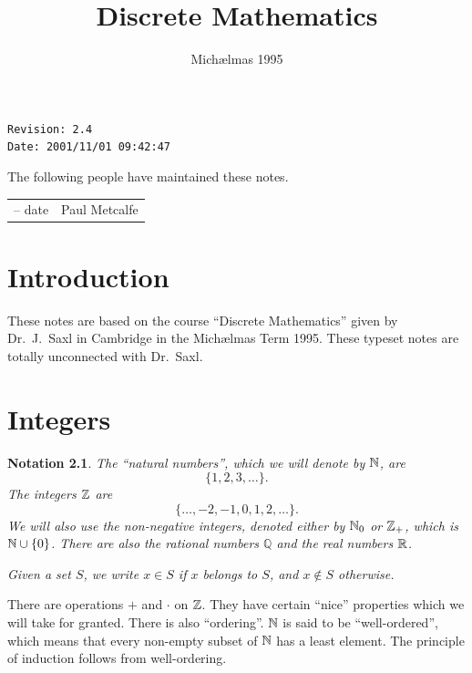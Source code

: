 \documentclass{notes}
\theoremstyle{plain}
\newtheorem*{notation}{Notation}
\newcommand{\Q}{\mathbb{Q}}
\begin{document}
\frontmatter
\title{Discrete Mathematics}
\date{Mich\ae lmas 1995} \maketitle

\thispagestyle{empty}
\noindent\verb$Revision: 2.4 $\hfill\\
\noindent\verb$Date: 2001/11/01 09:42:47 $\hfill

\vspace{1.5in}

The following people have maintained these notes.

\begin{center}
\begin{tabular}{ r  l}
-- date & Paul Metcalfe
\end{tabular}
\end{center}

\tableofcontents

\chapter{Introduction}

These notes are based on the course ``Discrete Mathematics''
given by Dr.~J.~Saxl in Cambridge in the Mich\ae lmas Term 1995.  These
typeset notes are totally unconnected with Dr.~Saxl.

\alsoavailable
\archimcopyright

\mainmatter

\chapter{Integers}

\begin{notation}
The ``natural numbers'', which we will denote by $\mathbb{N}$, are
\[
\{ 1,2,3,\dots \}.
\]  The integers $\mathbb{Z}$ are 
\[\{ \dots, -2, -1, 0, 1, 2, \dots \}.
\]  We will also use the non-negative integers, denoted either by
$\mathbb{N}_0$ or $\mathbb{Z}_+$, which is $\mathbb{N} \cup \{ 0 \}$.  There are also the rational
numbers $\Q$ and the real numbers $\mathbb{R}$.

Given a set $S$, we write $x \in S$ if $x$ belongs to $S$, and
$x \notin S$ otherwise.
\end{notation}

There are operations $+$ and $\cdot$ on $\mathbb{Z}$.  They have certain
``nice'' properties which we will take for granted.  There is also
``ordering''.  $\mathbb{N}$ is said to be ``well-ordered'', which means that
every non-empty subset of $\mathbb{N}$ has a least element.  The principle
of induction follows from well-ordering.
\end{document}
